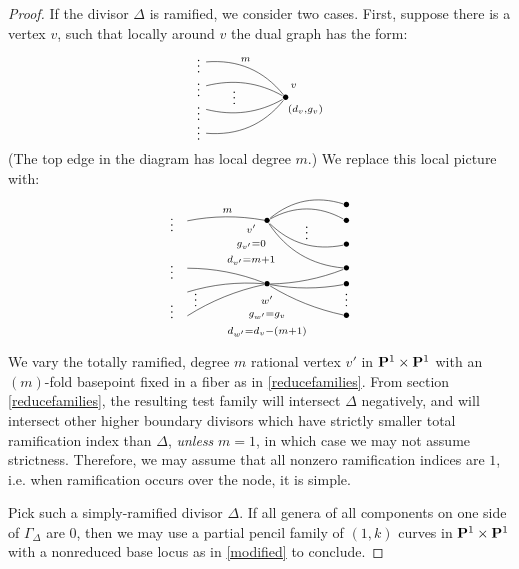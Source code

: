 \documentclass[reqno, 10 pt]{article}
\theoremstyle{definition}
\theoremstyle{remark}
\numberwithin{equation}{section}
\numberwithin{thm}{section}
\numberwithin{prop}{section}
\numberwithin{lem}{section}
\numberwithin{cor}{section}
\numberwithin{conj}{section}
\numberwithin{defn}{section}
\renewcommand{\P}{{\bf P}}
\begin{document}
\begin{proof}
    If the divisor $\Delta$ is ramified, we consider two cases.  First, suppose there is a vertex $v$, such that locally around $v$ the dual graph has the form: \[  \xygraph{
    !{<0cm,0cm>;<1cm,0cm>:<0cm,1cm>::}
    !{(0,.9) }*{}="l_1"
    !{(0,.3) }*{}="l_2"
    !{(0,-.3) }*{}="l_3"
    !{(0,-.9) }*{}="l_4"
    !{(2,0) }*{\bullet}="r"
    !{(.7,.1) }*{\vdots}
    !{(-.2,.9) }*{\vdots}
    !{(-.2,.3) }*{\vdots}
    !{(-.2,-.3) }*{\vdots}
    !{(-.2,-.8) }*{\vdots}
    !{(2.2,.3) }*{\scriptstyle v }
    !{(2.5,-.3) }*{\scriptstyle (d_v, g_v) }
     "l_1"-@/^.3cm/"r"^(.4){m} 
    "l_2"-@/^/"r"
    "l_3"-@/_/"r" 
    "l_4"-@/_.3cm/"r" 
    }  \]
     (The top edge in the diagram has local degree $m$.) We replace this local picture with: \[  \xygraph{
    !{<0cm,0cm>;<2cm,0cm>:<0cm,2cm>::}
    !{(0,.3) }*{}="l_2"
    !{(0,-.3) }*{}="l_3"
    !{(0,-.6) }*{}="l_{3.5}"
    !{(0,-.9) }*{}="l_4"
    !{(2,0) }*{\bullet}="r"
    !{(2,.3) }*{\bullet}="r+"
    !{(2,.5) }*{\bullet}="r++"
    !{(2,-.3) }*{\bullet}="r_2"
    !{(2,-.5) }*{\bullet}="r_3"!{(2,-.65) }*{\vdots}
    !{(2,-.9) }*{\bullet}="r_4"
!{(1,.3) }*{\bullet}="m_2"!{(.8,.2) }*{\scriptstyle v'}!{(.8,0) }*{\scriptstyle g_{v'} = 0} !{(.8,-.2) }*{\scriptstyle d_{v'} = m+1}
    !{(1,-.5) }*{\bullet}="m"!{(1,-.7) }*{\scriptstyle w'}!{(1,-.9) }*{\scriptstyle g_{w'} = g_{v}}!{(1,-1.1) }*{\scriptstyle d_{w'} = d_{v} - (m+1)}
    !{(-.2,.3) }*{\vdots}
    !{(-.2,-.3) }*{\vdots}
    !{(.1,-.65) }*++++{\vdots}
    !{(-.2,-.8) }*{\vdots}
    !{(1.5,.2) }*{\vdots}
    "m_2"-@/^.3cm/"r++" 
    "m_2"-@/^.3cm/"r+"
    "m_2"-@/_.3cm/"r"
    "m_2"-@/_.3cm/"r_2" 
    "m"-@/_.1cm/"l_4" 
    "m"-@/_.1cm/"l_3" 
    "m"-@/_.1cm/"l_{3.5}"
    "m_2"-@/_.1cm/"l_2"_{m}
    "m"-@/_.1cm/"r_4" 
    "m"-@/_.1cm/"r_3" 
    "m"-@/_.1cm/"r_2" 
    }  \]

    
    We vary the totally ramified, degree $m$ rational vertex $v'$ in ${\bf P}^1 \times {\bf P}^1$ with an $(m)$-fold basepoint fixed in a fiber as in \autoref{reducefamilies}.  From section \ref{reducefamilies}, the resulting test family will intersect $\Delta$ negatively, and will intersect other higher boundary divisors which have strictly smaller total ramification index than $\Delta$, {\sl unless } $m=1$, in which case we may not assume strictness.  Therefore, we may assume that all nonzero ramification indices are $1$, i.e. when ramification occurs over the node, it is simple.

    Pick such a simply-ramified divisor $\Delta$. If all genera of all components on one side of $\Gamma_{\Delta}$ are $0$, then we may use a partial pencil family of $(1,k)$ curves in $\P^{1} \times \P^{1}$ with a nonreduced base locus as in \autoref{modified} to conclude.  


\end{proof}
\end{document}
